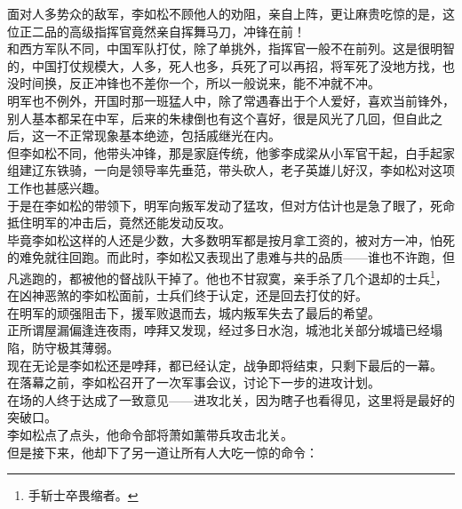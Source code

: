 \begin{multicols}{\theparacolNo}
面对人多势众的敌军，李如松不顾他人的劝阻，亲自上阵，更让麻贵吃惊的是，这位正二品的高级指挥官竟然亲自挥舞马刀，冲锋在前！\\

和西方军队不同，中国军队打仗，除了单挑外，指挥官一般不在前列。这是很明智的，中国打仗规模大，人多，死人也多，兵死了可以再招，将军死了没地方找，也没时间换，反正冲锋也不差你一个，所以一般说来，能不冲就不冲。\\

明军也不例外，开国时那一班猛人中，除了常遇春出于个人爱好，喜欢当前锋外，别人基本都呆在中军，后来的朱棣倒也有这个喜好，很是风光了几回，但自此之后，这一不正常现象基本绝迹，包括戚继光在内。\\

但李如松不同，他带头冲锋，那是家庭传统，他爹李成梁从小军官干起，白手起家组建辽东铁骑，一向是领导率先垂范，带头砍人，老子英雄儿好汉，李如松对这项工作也甚感兴趣。\\

于是在李如松的带领下，明军向叛军发动了猛攻，但对方估计也是急了眼了，死命抵住明军的冲击后，竟然还能发动反攻。\\

毕竟李如松这样的人还是少数，大多数明军都是按月拿工资的，被对方一冲，怕死的难免就往回跑。而此时，李如松又表现出了患难与共的品质——谁也不许跑，但凡逃跑的，都被他的督战队干掉了。他也不甘寂寞，亲手杀了几个退却的士兵\footnote{手斩士卒畏缩者。}，在凶神恶煞的李如松面前，士兵们终于认定，还是回去打仗的好。\\

在明军的顽强阻击下，援军败退而去，城内叛军失去了最后的希望。\\

正所谓屋漏偏逢连夜雨，哱拜又发现，经过多日水泡，城池北关部分城墙已经塌陷，防守极其薄弱。\\

现在无论是李如松还是哱拜，都已经认定，战争即将结束，只剩下最后的一幕。\\

在落幕之前，李如松召开了一次军事会议，讨论下一步的进攻计划。\\

在场的人终于达成了一致意见——进攻北关，因为瞎子也看得见，这里将是最好的突破口。\\

李如松点了点头，他命令部将萧如薰带兵攻击北关。\\

但是接下来，他却下了另一道让所有人大吃一惊的命令：\\


\end{multicols}
